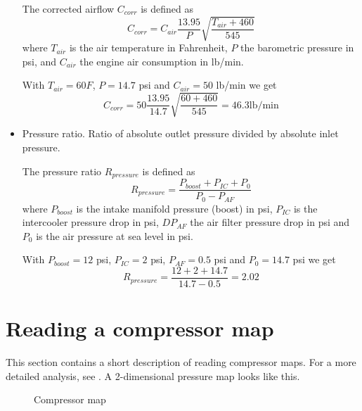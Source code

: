 \documentclass[11pt,a4paper]{book}
\newcommand{\Mfig}[1]{%
\begin{figure}
    \centering
    \missingfigure{#1}
    \caption{#1}
\end{figure}}
\begin{document}
\begin{itemize}
        \begin{definition}
            The corrected airflow $C_{corr}$ is defined as
            \begin{equation}
                C_{corr}=C_{air}\frac{13.95}{P}\sqrt{\frac{T_{air} +460}{545}}
            \end{equation}
            where $T_{air}$ is the air temperature in Fahrenheit, $P$ the barometric pressure in
            psi, and $C_{air}$ the
            engine air consumption in lb/min.
            \label{def:corrected-airflow}
        \end{definition}
        \begin{example}
            With $T_{air}=60 F$, $P=14.7$ psi and $C_{air}=50$ lb/min we get
            \begin{equation}
                C_{corr}=50\frac{13.95}{14.7}\sqrt{\frac{60+460}{545}}=46.3\text{
                lb/min}
            \end{equation}
            \label{ex:corrected-airflow}
        \end{example}
    \item Pressure ratio. Ratio of absolute outlet pressure divided by absolute
        inlet pressure.
        \begin{definition}
            The pressure ratio $R_{pressure}$ is defined as
            \begin{equation}
                R_{pressure}=\frac{P_{boost}+P_{IC}+P_0}{P_0-P_{AF}}
            \end{equation}
            where $P_{boost}$ is the intake manifold pressure
            (boost) in psi, $P_{IC}$ is the intercooler pressure
            drop in psi,
            $DP_{AF}$ the air filter pressure drop in psi and $P_0$ is the air pressure
            at sea level in psi.
            \label{}
        \end{definition}
        \begin{example}
            With $P_{boost}=12$ psi, $P_{IC}=2$ psi, $P_{AF}=0.5$ psi and
            $P_0=14.7$ psi we get
            \begin{equation}
                R_{pressure}=\frac{12+2+14.7}{14.7-0.5}=2.02
                \label{}
            \end{equation}

        \end{example}
\end{itemize}
\section{Reading a compressor map}
This section contains a short description of reading compressor maps. For a more
detailed analysis, see
\textcite{Isaac-Lowry2004}. A 2-dimensional pressure map looks like this.
\Mfig{Compressor map}
\end{document}
